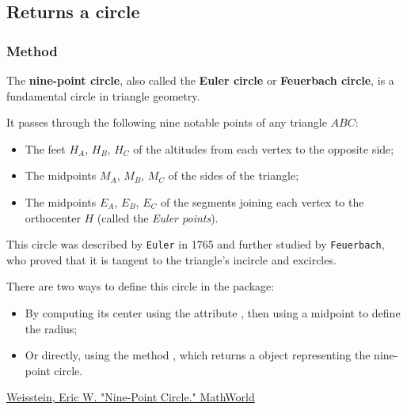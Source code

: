 
\subsection{Returns  a circle}
\subsubsection{Method } %
\label{ssub:method_triangle_euler_circle}

The \textbf{nine-point circle}, also called the \textbf{Euler circle} or \textbf{Feuerbach circle}, is a fundamental circle in triangle geometry.

\medskip

It passes through the following nine notable points of any triangle $ABC$:
\begin{itemize}
  \item The feet $H_A$, $H_B$, $H_C$ of the altitudes from each vertex to the opposite side;
  \item The midpoints $M_A$, $M_B$, $M_C$ of the sides of the triangle;
  \item The midpoints $E_A$, $E_B$, $E_C$ of the segments joining each vertex to the orthocenter $H$ (called the \emph{Euler points}).
\end{itemize}


This circle was described by \texttt{Euler} in 1765 and further studied by \texttt{Feuerbach}, who proved that it is tangent to the triangle’s incircle and excircles.

\medskip

There are two ways to define this circle in the package:
\begin{itemize}
  \item By computing its center using the attribute , then using a midpoint to define the radius;
  \item Or directly, using the method , which returns a  object representing the nine-point circle.
\end{itemize}
\begin{flushright}
\small
\href{https://mathworld.wolfram.com/Nine-PointCircle.html}{Weisstein, Eric W. "Nine-Point Circle." MathWorld}
\end{flushright}

\vspace{1em}
\begin{tkzexample}[latex=.5\textwidth]
\begin{center}
\end{center}
\end{tkzexample}

